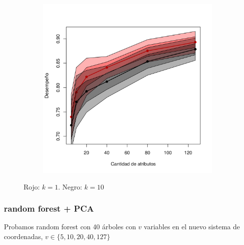 \documentclass[a4paper,10pt]{article}
\begin{document}
\begin{figure}[H]
  \centering
  \begin{subfigure}[b]{0.4\textwidth}
    \includegraphics[width=\textwidth]{../imagenes/knn}
  \end{subfigure}
  \caption{Rojo: $k=1$. Negro: $k=10$ }
  \label{fig:knn-n_neighbors}
\end{figure}

\subsubsection{random forest + PCA}

Probamos random forest con 40 \'arboles con $v$ variables en el nuevo sistema de coordenadas, $v \in \{5,10,20,40,127\}$
\end{document}
